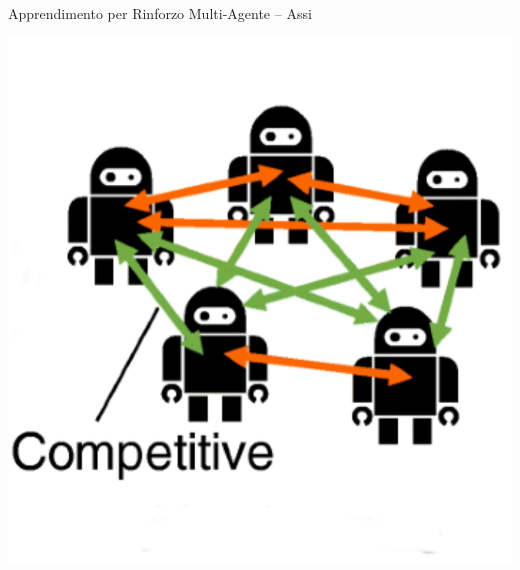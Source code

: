 \documentclass[presentation, 10pt,aspectratio=169]{beamer}\mode<presentation>{\usetheme{AMSBolognaFC}}
\begin{document}
\begin{frame}{Apprendimento per Rinforzo Multi-Agente -- Assi}
	\begin{minipage}{0.45\textwidth}
		\centering
		\includegraphics[width=\textwidth]{img/competitive.png}
	\end{minipage}
	\hfill
	\begin{minipage}{0.45\textwidth}
		\centering
	\end{minipage}

\end{frame}
\end{document}
